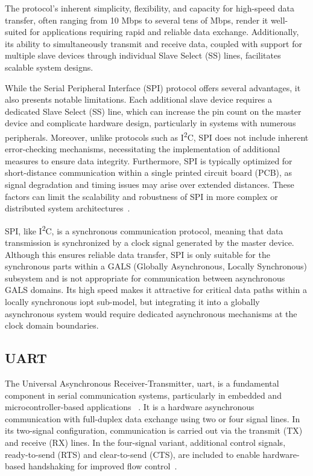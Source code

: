 The protocol’s inherent simplicity, flexibility, and capacity for high-speed data transfer, often ranging from 10 Mbps to several tens of Mbps, render it well-suited for applications requiring rapid and reliable data exchange. Additionally, its ability to simultaneously transmit and receive data, coupled with support for multiple slave devices through individual Slave Select (SS) lines, facilitates scalable system designs.

While the Serial Peripheral Interface (SPI) protocol offers several advantages, it also presents notable limitations. Each additional slave device requires a dedicated Slave Select (SS) line, which can increase the pin count on the master device and complicate hardware design, particularly in systems with numerous peripherals. Moreover, unlike protocols such as  I\textsuperscript{2}C, SPI does not include inherent error-checking mechanisms, necessitating the implementation of additional measures to ensure data integrity. Furthermore, SPI is typically optimized for short-distance communication within a single printed circuit board (PCB), as signal degradation and timing issues may arise over extended distances. These factors can limit the scalability and robustness of SPI in more complex or distributed system architectures~\cite{spisite2}.


SPI, like I\textsuperscript{2}C, is a synchronous communication protocol, meaning that data transmission is synchronized by a clock signal generated by the master device. Although this ensures reliable data transfer, SPI is only suitable for the synchronous parts within a GALS (Globally Asynchronous, Locally Synchronous) subsystem and is not appropriate for communication between asynchronous GALS domains. Its high speed makes it attractive for critical data paths within a locally synchronous \gls{iopt} sub-model, but integrating it into a globally asynchronous system would require dedicated asynchronous mechanisms at the clock domain boundaries.

\subsection{UART}
\label{sub:uart}

The Universal Asynchronous Receiver-Transmitter, \gls{uart}, is a fundamental component in serial communication systems, particularly in embedded and microcontroller-based applications ~\cite{UARTwiki}. It is a hardware asynchronous communication with full-duplex data exchange using two or four signal lines. In its two-signal configuration, communication is carried out via the transmit (TX) and receive (RX) lines. In the four-signal variant, additional control signals, ready-to-send (RTS) and clear-to-send (CTS), are included to enable hardware-based handshaking for improved flow control~\cite{Rao2021}.

